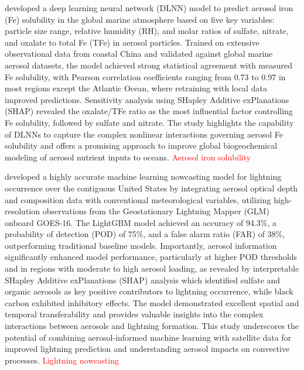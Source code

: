 \documentclass[11pt]{article}
\begin{document}
\citet{shi2022aerosol} developed a deep learning neural network (DLNN) model to predict aerosol iron (Fe) solubility in the global marine atmosphere based on five key variables: particle size range, relative humidity (RH), and molar ratios of sulfate, nitrate, and oxalate to total Fe (TFe) in aerosol particles. Trained on extensive observational data from coastal China and validated against global marine aerosol datasets, the model achieved strong statistical agreement with measured Fe solubility, with Pearson correlation coefficients ranging from 0.73 to 0.97 in most regions except the Atlantic Ocean, where retraining with local data improved predictions. Sensitivity analysis using SHapley Additive exPlanations (SHAP) revealed the oxalate/TFe ratio as the most influential factor controlling Fe solubility, followed by sulfate and nitrate. The study highlights the capability of DLNNs to capture the complex nonlinear interactions governing aerosol Fe solubility and offers a promising approach to improve global biogeochemical modeling of aerosol nutrient inputs to oceans. \textcolor{red}{Aerosol iron solubility}

\citet{song2023lightning} developed a highly accurate machine learning nowcasting model for lightning occurrence over the contiguous United States by integrating aerosol optical depth and composition data with conventional meteorological variables, utilizing high-resolution observations from the Geostationary Lightning Mapper (GLM) onboard GOES-16. The LightGBM model achieved an accuracy of 94.3\%, a probability of detection (POD) of 75\%, and a false alarm ratio (FAR) of 38\%, outperforming traditional baseline models. Importantly, aerosol information significantly enhanced model performance, particularly at higher POD thresholds and in regions with moderate to high aerosol loading, as revealed by interpretable SHapley Additive exPlanations (SHAP) analysis which identified sulfate and organic aerosols as key positive contributors to lightning occurrence, while black carbon exhibited inhibitory effects. The model demonstrated excellent spatial and temporal transferability and provides valuable insights into the complex interactions between aerosols and lightning formation. This study underscores the potential of combining aerosol-informed machine learning with satellite data for improved lightning prediction and understanding aerosol impacts on convective processes. \textcolor{red}{Lightning nowcasting}
\end{document}
